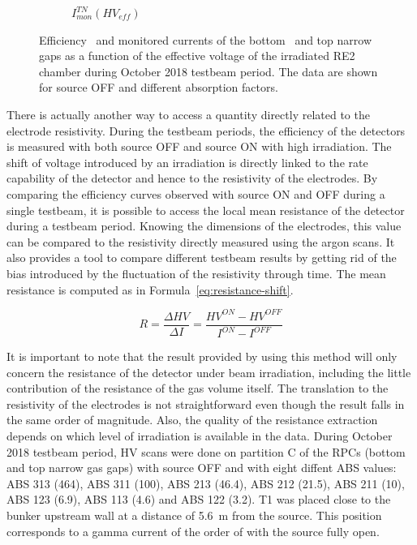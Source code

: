 \begin{figure}[H]
\begin{subfigure}{0.5\linewidth}
        	\caption{\label{fig:october-sig:C} $I_{mon}^{TN}(HV_{eff})$}
    	\end{subfigure}
		\caption{\label{fig:october-sig} Efficiency~ and monitored currents of the bottom~ and top narrow~ gaps as a function of the effective voltage of the irradiated RE2 chamber during October 2018 testbeam period. The data are shown for source OFF and different absorption factors.}
	\end{figure}
	
	There is actually another way to access a quantity directly related to the electrode resistivity. During the testbeam periods, the efficiency of the detectors is measured with both source OFF and source ON with high irradiation. The shift of voltage introduced by an irradiation is directly linked to the rate capability of the detector and hence to the resistivity of the electrodes. By comparing the efficiency curves observed with source ON and OFF during a single testbeam, it is possible to access the local mean resistance of the detector during a testbeam period. Knowing the dimensions of the electrodes, this value can be compared to the resistivity directly measured using the argon scans. It also provides a tool to compare different testbeam results by getting rid of the bias introduced by the fluctuation of the resistivity through time. The mean resistance is computed as in Formula~\ref{eq:resistance-shift}.
	
	\begin{equation}
	\label{eq:resistance-shift}
	R = \frac{\Delta HV}{\Delta I} = \frac{HV^{ON} - HV^{OFF}}{I^{ON} - I^{OFF}}
	\end{equation}
	
	It is important to note that the result provided by using this method will only concern the resistance of the detector under beam irradiation, including the little contribution of the resistance of the gas volume itself. The translation to the resistivity of the electrodes is not straightforward even though the result falls in the same order of magnitude. Also, the quality of the resistance extraction depends on which level of irradiation is available in the data. During October 2018 testbeam period, HV scans were done on partition C of the RPCs (bottom and top narrow gas gaps) with source OFF and with eight diffent ABS values: ABS 313 (464), ABS 311 (100), ABS 213 (46.4), ABS 212 (21.5), ABS 211 (10), ABS 123 (6.9), ABS 113 (4.6) and ABS 122 (3.2). T1 was placed close to the bunker upstream wall at a distance of \SI{5.6}{m} from the source. This position corresponds to a gamma current of the order of \siflux with the source fully open.
	

